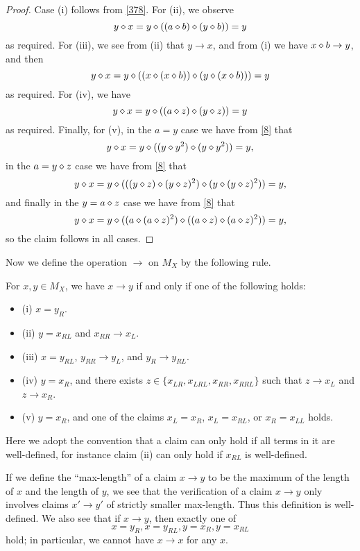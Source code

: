 \begin{proof}  Case (i) follows from \eqref{378}.  For (ii), we observe
$$ y \diamond x = y \diamond ((a \diamond b) \diamond (y \diamond b)) = y$$
as required.  For (iii), we see from (ii) that $y \to x$, and from (i) we have $x \diamond b \to y$, and then
$$ y \diamond x = y \diamond ((x \diamond (x \diamond b)) \diamond (y \diamond (x \diamond b))) = y$$
as required.  For (iv), we have
$$ y \diamond x = y \diamond ((a \diamond z) \diamond (y \diamond z)) = y$$
as required.  Finally, for (v), in the $a=y$ case we have from \eqref{8} that
$$ y \diamond x = y \diamond ((y \diamond y^2) \diamond (y \diamond y^2)) = y,$$
in the $a = y \diamond z$ case we have from \eqref{8} that
$$ y \diamond x = y \diamond (((y \diamond z) \diamond (y \diamond z)^2) \diamond (y \diamond (y \diamond z)^2)) = y,$$
and finally in the $y = a \diamond z$ case we have from \eqref{8} that
$$ y \diamond x = y \diamond ( (a \diamond (a \diamond z)^2) \diamond ((a \diamond z) \diamond (a \diamond z)^2)) = y,$$
so the claim follows in all cases.
\end{proof}

Now we define the operation $\to$ on $M_X$ by the following rule.

\begin{definition}\label{free-relate} For $x,y \in M_X$, we have $x \to y$ if and only if one of the following holds:
\begin{itemize}
\item (i) $x = y_R$.
\item (ii) $y = x_{RL}$ and $x_{RR} \to x_L$.
\item (iii) $x = y_{RL}$, $y_{RR} \to y_L$, and $y_R \to y_{RL}$.
\item (iv) $y = x_R$, and there exists $z \in \{ x_{LR}, x_{LRL}, x_{RR}, x_{RRL} \}$ such that $z \to x_L$ and $z \to x_R$.
\item (v)  $y = x_R$, and one of the claims $x_L = x_R$, $x_L = x_{RL}$, or $x_R = x_{LL}$ holds.
\end{itemize}
Here we adopt the convention that a claim can only hold if all terms in it are well-defined, for instance claim (ii) can only hold if $x_{RL}$ is well-defined.
\end{definition}

If we define the ``max-length'' of a claim $x \to y$ to be the maximum of the length of $x$ and the length of $y$, we see that the verification of a claim $x \to y$ only involves claims $x' \to y'$ of strictly smaller max-length.  Thus this definition is well-defined.  We also see that if $x \to y$, then exactly one of
\begin{equation}\label{one}
  x=y_R, x=y_{RL}, y = x_R, y=x_{RL}
\end{equation}
hold; in particular, we cannot have $x \to x$ for any $x$.

